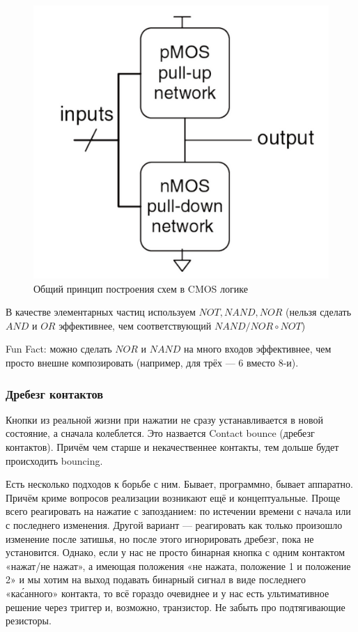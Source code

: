 \documentclass[12pt, a4paper]{article}
\begin{document}
\begin{figure}[h!]
    \centering
    \includegraphics[width=\textwidth]{images/general_cmos_element_scheme.png}
    \caption{Общий принцип построения схем в CMOS логике}
    \label{fig:cmos_general}
\end{figure}
\FloatBarrier

В качестве элементарных частиц используем $NOT, NAND, NOR$ (нельзя сделать $AND$ и $OR$ эффективнее, чем соответствующий $NAND/NOR \circ NOT$)

Fun Fact: можно сделать $NOR$ и $NAND$ на много входов эффективнее, чем просто внешне композировать (например, для трёх — 6 вместо 8-и).


\subsubsection{Дребезг контактов}

Кнопки из реальной жизни при нажатии не сразу устанавливается в новой состояние, а сначала колеблется. 
Это назвается Contact bounce (дребезг контактов). Причём чем старше и некачественнее контакты, тем дольше будет происходить bouncing.

Есть несколько подходов к борьбе с ним. Бывает, программно, бывает аппаратно.
Причём криме вопросов реализации возникают ещё и концептуальные. 
Проще всего реагировать на нажатие с запозданием: по истечении времени с начала или с последнего изменения.
Другой вариант — реагировать как только произошло изменение после затишья, но после этого игнорировать дребезг, пока не установится.
Однако, если у нас не просто бинарная кнопка с одним контактом «нажат/не нажат», 
а имеющая положения «не нажата, положение 1 и положение 2» и мы хотим на выход подавать бинарный сигнал в виде последнего «ка\'санного» контакта, 
то всё гораздо очевиднее и у нас есть ультимативное решение через триггер и, возможно, транзистор.
Не забыть про подтягивающие резисторы.
\end{document}

